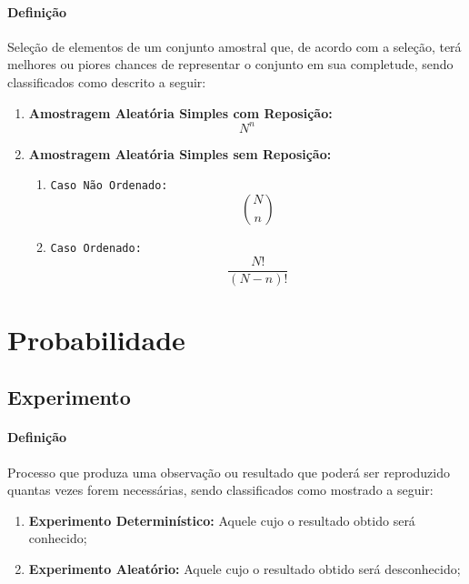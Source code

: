 \documentclass{article}
\begin{document}
            \paragraph{Definição}Seleção de elementos de um conjunto amostral que, de acordo com a seleção, terá melhores ou piores chances de representar o conjunto em sua completude, sendo classificados como descrito a seguir:
                \begin{enumerate}[noitemsep]
                    \item \textbf{Amostragem Aleatória Simples com Reposição:} 
                        \begin{equation}
                            \boxed{
                                N^{n}
                            }
                        \end{equation}
                    \item \textbf{Amostragem Aleatória Simples sem Reposição:} 
                        \begin{enumerate}[noitemsep]
                            \item \texttt{Caso Não Ordenado:} 
                                \begin{equation}
                                    \boxed{
                                        \binom{N}{n}
                                    }
                                \end{equation}
                            \item \texttt{Caso Ordenado:} 
                                \begin{equation}
                                    \boxed{
                                        \frac{N!}{(N - n)!}
                                    }
                                \end{equation}
                        \end{enumerate}
                \end{enumerate}

\newpage

    \section{Probabilidade}
        \subsection{Experimento}
            \paragraph{Definição}Processo que produza uma observação ou resultado que poderá ser reproduzido quantas vezes forem necessárias, sendo classificados como mostrado a seguir:
                \begin{enumerate}[noitemsep]
                    \item \textbf{Experimento Determinístico:} Aquele cujo o resultado obtido será conhecido;
                    \item \textbf{Experimento Aleatório:} Aquele cujo o resultado obtido será desconhecido;
                \end{enumerate}
\end{document}
